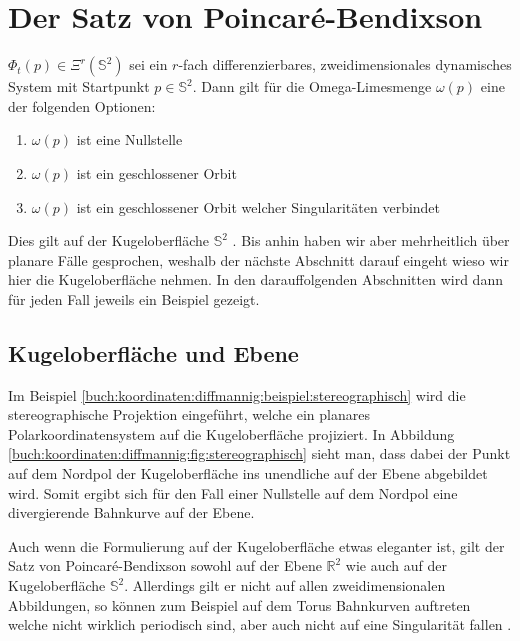 \section{Der Satz von Poincaré-Bendixson} \label{poinbendix:section:poinbendix}

\begin{satz}
\label{poinbendix:satz:poinbendix}
$\Phi_t(p) \in \Xi^r(\mathbb{S}^2)$ sei ein $r$-fach differenzierbares, zweidimensionales dynamisches System mit Startpunkt $p \in \mathbb{S}^2$.
Dann gilt für die Omega-Limesmenge $\omega(p)$ eine der folgenden Optionen:
\begin{enumerate}
\item $\omega(p)$ ist eine Nullstelle
\item $\omega(p)$ ist ein geschlossener Orbit
\item $\omega(p)$ ist ein geschlossener Orbit welcher Singularitäten verbindet
\end{enumerate}
\end{satz}

Dies gilt auf der Kugeloberfläche $\mathbb{S}^2$ \cite{poinbendix:melo}.
Bis anhin haben wir aber mehrheitlich über planare Fälle gesprochen, weshalb der nächste Abschnitt darauf eingeht wieso wir hier die Kugeloberfläche nehmen.
In den darauffolgenden Abschnitten wird dann für jeden Fall jeweils ein Beispiel gezeigt.

\subsection{Kugeloberfläche und Ebene} \label{poinbendix:subsection:kugeloberflaeche}

Im Beispiel \ref{buch:koordinaten:diffmannig:beispiel:stereographisch} wird die stereographische Projektion eingeführt, welche ein planares Polarkoordinatensystem auf die Kugeloberfläche projiziert.
In Abbildung \ref{buch:koordinaten:diffmannig:fig:stereographisch} sieht man, dass dabei der Punkt auf dem Nordpol der Kugeloberfläche ins unendliche auf der Ebene abgebildet wird.
Somit ergibt sich für den Fall einer Nullstelle auf dem Nordpol eine divergierende Bahnkurve auf der Ebene.

Auch wenn die Formulierung auf der Kugeloberfläche etwas eleganter ist, gilt der Satz von Poincaré-Bendixson sowohl auf der Ebene $\mathbb{R}^2$ wie auch auf der Kugeloberfläche $\mathbb{S}^2$.
Allerdings gilt er nicht auf allen zweidimensionalen Abbildungen, so können zum Beispiel auf dem Torus Bahnkurven auftreten welche nicht wirklich periodisch sind, aber auch nicht auf eine Singularität fallen \cite{poinbendix:wiki}.


